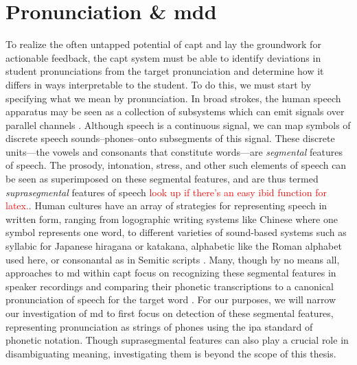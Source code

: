 \documentclass[thesis]{cluu}
\newcommand{\todo}[1]{\textcolor{red}{#1}}
\begin{document}
\section{Pronunciation \& \acrfull{mdd}} \label{mdd}
To realize the often untapped potential of \gls{capt} and lay the groundwork for actionable feedback, the \gls{capt} system must be able to identify deviations in student pronunciations from the target pronunciation and determine how it differs in ways interpretable to the student. To do this, we must start by specifying what we mean by pronunciation. In broad strokes, the human speech apparatus may be seen as a collection of subsystems which can emit signals over parallel channels \parencite[p. 173]{engstrandFonetikensGrunder2004}. Although speech is a continuous signal, we can map symbols of discrete speech sounds--phones--onto subsegments of this signal. These discrete units---the vowels and consonants that constitute words---are \textit{segmental} features of speech. The prosody, intonation, stress, and other such elements of speech can be seen as superimposed on these segmental features, and are thus termed \textit{suprasegmental} features of speech \parencite{engstrandFonetikensGrunder2004} \todo{look up if there's an easy ibid function for latex.}. Human cultures have an array of strategies for representing speech in written form, ranging from logographic writing systems like Chinese where one symbol represents one word, to different varieties of sound-based systems such as syllabic for Japanese hiragana or katakana, alphabetic like the Roman alphabet used here, or consonantal as in Semitic scripts \parencite{jurafskySpeechLanguageProcessing2025}. Many, though by no means all, approaches to \gls{md} within \gls{capt} focus on recognizing these segmental features in speaker recordings and comparing their phonetic transcriptions to a canonical pronunciation of speech for the target word \parencite{korzekwaComputerassistedPronunciationTraining2022}. For our purposes, we will narrow our investigation of \gls{md} to first focus on detection of these segmental features, representing pronunciation as strings of phones using the \gls{ipa} standard of phonetic notation. Though suprasegmental features can also play a crucial role in disambiguating meaning, investigating them is beyond the scope of this thesis.
\end{document}
